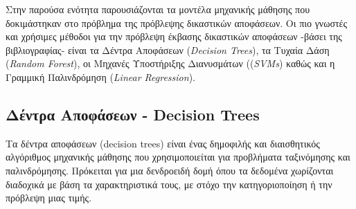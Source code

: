 \documentclass[diploma]{softlab-thesis}
\begin{document}
Στην παρούσα ενότητα παρουσιάζονται τα μοντέλα μηχανικής μάθησης που δοκιμάστηκαν στο πρόβλημα της πρόβλεψης δικαστικών αποφάσεων. Οι πιο γνωστές και χρήσιμες μέθοδοι για την πρόβλεψη έκβασης δικαστικών αποφάσεων -βάσει της βιβλιογραφίας- είναι τα Δέντρα Αποφάσεων (\textit{Decision Trees}), τα Τυχαία Δάση (\textit{Random  Forest}), οι Μηχανές Υποστήριξης Διανυσμάτων ((\textit{SVMs}) καθώς και η Γραμμική Παλινδρόμηση (\textit{Linear Regression}).\cite{6}

\subsection{Δέντρα Αποφάσεων - Decision Trees}

Τα δέντρα αποφάσεων (decision trees) είναι ένας δημοφιλής και διαισθητικός αλγόριθμος μηχανικής μάθησης που χρησιμοποιείται για προβλήματα ταξινόμησης και παλινδρόμησης. Πρόκειται για μια δενδροειδή δομή όπου τα δεδομένα χωρίζονται διαδοχικά με βάση τα χαρακτηριστικά τους, με στόχο την κατηγοριοποίηση ή την πρόβλεψη μιας τιμής.
\end{document}
